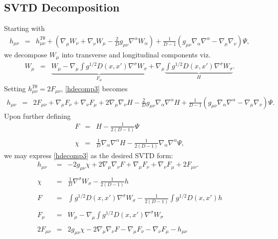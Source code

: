 \documentclass[10pt,letterpaper]{article}
\numberwithin{equation}{section}
\begin{document}
\subsection{SVTD Decomposition}
%
%
Starting with 
\begin{eqnarray}
h_{\mu\nu} &=& h_{\mu\nu}^{T\theta} + \left(\nabla_\mu W_\nu + \nabla_\nu W_\mu - \frac{2}{D}g_{\mu\nu}\nabla^\alpha W_\alpha\right) +\frac{1}{D-1}\left( g_{\mu\nu}\nabla_\alpha \nabla^\alpha - \nabla_\mu\nabla_\nu\right)\Psi,
\label{hdecomp3}
\end{eqnarray}
we decompose $W_{\mu}$ into transverse and longitudinal components viz.
\begin{eqnarray}
W_{\mu} &=& \underbrace{W_{\mu} -\nabla_\mu \int g^{1/2} D(x,x')\nabla^{\sigma}W_\sigma}_{F_{\mu}} + \nabla_\mu \underbrace{ \int g^{1/2}D(x,x')\nabla^\sigma W_\sigma}_{H}.
\end{eqnarray}
Setting $h_{\mu\nu}^{T\theta} = 2F_{\mu\nu}$, \eqref{hdecomp3} becomes
\begin{eqnarray}
h_{\mu\nu}&=& 2F_{\mu\nu} + \nabla_\mu F_\nu + \nabla_\nu F_\mu + 2 \nabla_\mu\nabla_\nu H - \frac{2}{D}g_{\mu\nu}\nabla_\alpha \nabla^\alpha H +\frac{1}{D-1}\left( g_{\mu\nu}\nabla_\alpha \nabla^\alpha - \nabla_\mu\nabla_\nu\right)\Psi.
\end{eqnarray}
Upon further defining
\begin{eqnarray}
F &=& H - \frac{1}{2(D-1)} \Psi
\\ \nonumber\\
\chi &=& \frac{1}{D}\nabla_\alpha\nabla^\alpha H - \frac{1}{2(D-1)}\nabla_\alpha\nabla^\alpha \Psi,
\end{eqnarray}
we may express \eqref{hdecomp3} as the desired SVTD form:
\begin{eqnarray}
h_{\mu\nu} &=& -2g_{\mu\nu}\chi + 2\nabla_\mu\nabla_\nu F + \nabla_\mu F_\nu + \nabla_\nu F_\mu + 2F_{\mu\nu}.
\\ \nonumber\\
\chi &=& \frac{1}{D}\nabla^\sigma W_{\sigma}  - \frac{1}{2(D-1)}h
\\ \nonumber\\
F &=& \int g^{1/2} D(x,x') \nabla^\sigma W_{\sigma}  - \frac{1}{2(D-1)}\int g^{1/2} D(x,x') h
\\ \nonumber\\
F_{\mu} &=& W_{\mu} -\nabla_\mu \int g^{1/2} D(x,x')\nabla^{\sigma}W_\sigma
\\ \nonumber\\
2F_{\mu\nu} &=& 2g_{\mu\nu}\chi - 2\nabla_\mu\nabla_\nu F - \nabla_\mu F_\nu - \nabla_\nu F_{\mu} - h_{\mu\nu} 
\end{eqnarray}
\end{document}
